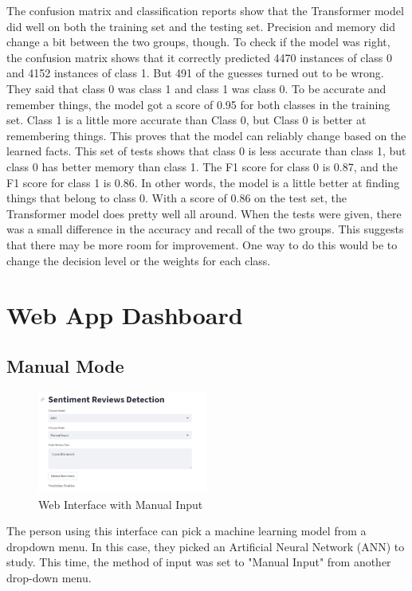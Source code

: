 \documentclass[11pt,a4paper]{article}
\begin{document}
The confusion matrix and classification reports show that the Transformer model did well on both the training set and the testing set. Precision and memory did change a bit between the two groups, though. To check if the model was right, the confusion matrix shows that it correctly predicted 4470 instances of class 0 and 4152 instances of class 1. But 491 of the guesses turned out to be wrong. They said that class 0 was class 1 and class 1 was class 0.
To be accurate and remember things, the model got a score of 0.95 for both classes in the training set. Class 1 is a little more accurate than Class 0, but Class 0 is better at remembering things. This proves that the model can reliably change based on the learned facts.
This set of tests shows that class 0 is less accurate than class 1, but class 0 has better memory than class 1. The F1 score for class 0 is 0.87, and the F1 score for class 1 is 0.86. In other words, the model is a little better at finding things that belong to class 0.
With a score of 0.86 on the test set, the Transformer model does pretty well all around. When the tests were given, there was a small difference in the accuracy and recall of the two groups. This suggests that there may be more room for improvement. One way to do this would be to change the decision level or the weights for each class.


\section{Web App Dashboard}

\subsection{Manual Mode}

\begin{figure}[ht]
    \centering
    \includegraphics[width=0.5\textwidth]{web1.png}
    \caption{Web Interface with Manual Input}
    \label{fig:polarity_distribution}
\end{figure}

The person using this interface can pick a machine learning model from a dropdown menu. In this case, they picked an Artificial Neural Network (ANN) to study. This time, the method of input was set to "Manual Input" from another drop-down menu.
\end{document}
